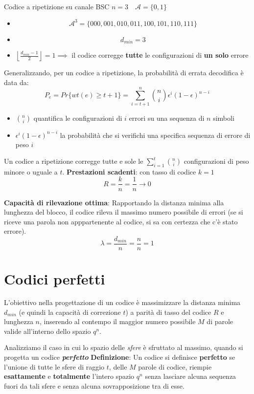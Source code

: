 \begin{esempio}{Codice a ripetizione su canale  BSC $n=3 \quad \mathcal{A}=\{0,1\}$}
\begin{itemize}
    \item \[\mathcal{A}^3 =\{000,001,010,011,100,101,110,111\}\]
    \item \[d_{min}=3\]
    \item $\left\lfloor \frac{d_{min}-1}{2} \right\rfloor = 1 \implies$ il codice corregge \textbf{tutte} le configurazioni di \textbf{un solo} errore
\end{itemize}



\end{esempio}

Generalizzando, per un codice a ripetizione, la probabilità di errata decodifica è data da:
\[P_e= Pr\{wt(e) \geq t+1\} =\sum_{i=t+1}^n\binom{n}{i}\epsilon^i(1-\epsilon)^{n-i}\]
\begin{itemize}
    \item $\binom{n}{i}$ quantifica le configurazioni di $i$ errori su una sequenza di $n$ simboli
    \item $\epsilon^i(1-\epsilon)^{n-i}$ la probabilità che si verifichi una specifica sequenza di errore di peso $i$
\end{itemize}

Un codice a ripetizione corregge tutte e sole le $\sum_{i=1}^t\binom{n}{i}$ configurazioni di peso minore o uguale a $t$.
\textbf{Prestazioni scadenti}:  con tasso di codice $k=1$
\[R= \frac{k}{n}=\frac{1}{n} \to 0\]

\textbf{Capacità di rilevazione ottima}: Rapportando la distanza minima alla lunghezza del blocco, il codice rileva il massimo numero possibile di errori (se si riceve una parola non apppartenente al codice, si sa con certezza che c'è stato errore).
\[\lambda = \frac{d_{min}}{n} = \frac{n}{n} = 1\]

\section{Codici perfetti}
L'obiettivo nella progettazione di un codice è massimizzare la distanza minima $d_{min}$ (e quindi la capacità di correzione $t$) a parità di tasso del codice $R$ e lunghezza $n$, inserendo al contempo il maggior numero possibile $M$ di parole valide all'interno dello spazio $q^n$.

Analizziamo il caso in cui lo spazio delle \textit{sfere} è sfruttato al massimo, quando si progetta un codice \textbf{\textit{perfetto}}
\textbf{Definizione}:
Un codice si definisce \textbf{perfetto} se l'unione di tutte le sfere di raggio $t$, delle $M$ parole di codice, riempie \textbf{esattamente} e \textbf{totalmente} l'intero spazio $q^n$ senza lasciare alcuna sequenza fuori da tali sfere e senza alcuna sovrapposizione tra di esse.

